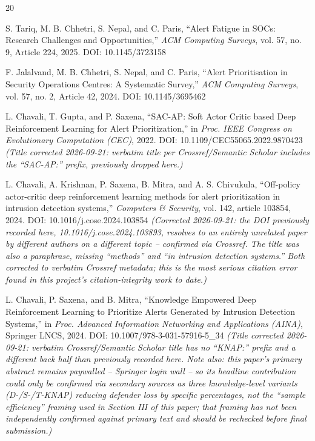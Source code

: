 \documentclass[conference]{IEEEtran}
\begin{document}


\begin{thebibliography}{20}

S. Tariq, M. B. Chhetri, S. Nepal, and C. Paris, ``Alert Fatigue in SOCs: Research Challenges and Opportunities,'' \emph{ACM Computing Surveys}, vol. 57, no. 9, Article 224, 2025. DOI: 10.1145/3723158

F. Jalalvand, M. B. Chhetri, S. Nepal, and C. Paris, ``Alert Prioritisation in Security Operations Centres: A Systematic Survey,'' \emph{ACM Computing Surveys}, vol. 57, no. 2, Article 42, 2024. DOI: 10.1145/3695462

L. Chavali, T. Gupta, and P. Saxena, ``SAC-AP: Soft Actor Critic based Deep Reinforcement Learning for Alert Prioritization,'' in \emph{Proc. IEEE Congress on Evolutionary Computation (CEC)}, 2022. DOI: 10.1109/CEC55065.2022.9870423 \emph{(Title corrected 2026-09-21: verbatim title per Crossref/Semantic Scholar includes the ``SAC-AP:'' prefix, previously dropped here.)}

L. Chavali, A. Krishnan, P. Saxena, B. Mitra, and A. S. Chivukula, ``Off-policy actor-critic deep reinforcement learning methods for alert prioritization in intrusion detection systems,'' \emph{Computers \& Security}, vol. 142, article 103854, 2024. DOI: 10.1016/j.cose.2024.103854 \emph{(Corrected 2026-09-21: the DOI previously recorded here, 10.1016/j.cose.2024.103893, resolves to an entirely unrelated paper by different authors on a different topic -- confirmed via Crossref. The title was also a paraphrase, missing ``methods'' and ``in intrusion detection systems.'' Both corrected to verbatim Crossref metadata; this is the most serious citation error found in this project's citation-integrity work to date.)}

L. Chavali, P. Saxena, and B. Mitra, ``Knowledge Empowered Deep Reinforcement Learning to Prioritize Alerts Generated by Intrusion Detection Systems,'' in \emph{Proc. Advanced Information Networking and Applications (AINA)}, Springer LNCS, 2024. DOI: 10.1007/978-3-031-57916-5\_34 \emph{(Title corrected 2026-09-21: verbatim Crossref/Semantic Scholar title has no ``KNAP:'' prefix and a different back half than previously recorded here. Note also: this paper's primary abstract remains paywalled -- Springer login wall -- so its headline contribution could only be confirmed via secondary sources as three knowledge-level variants (D-/S-/T-KNAP) reducing defender loss by specific percentages, not the ``sample efficiency'' framing used in Section III of this paper; that framing has not been independently confirmed against primary text and should be rechecked before final submission.)}


\end{thebibliography}
\end{document}

